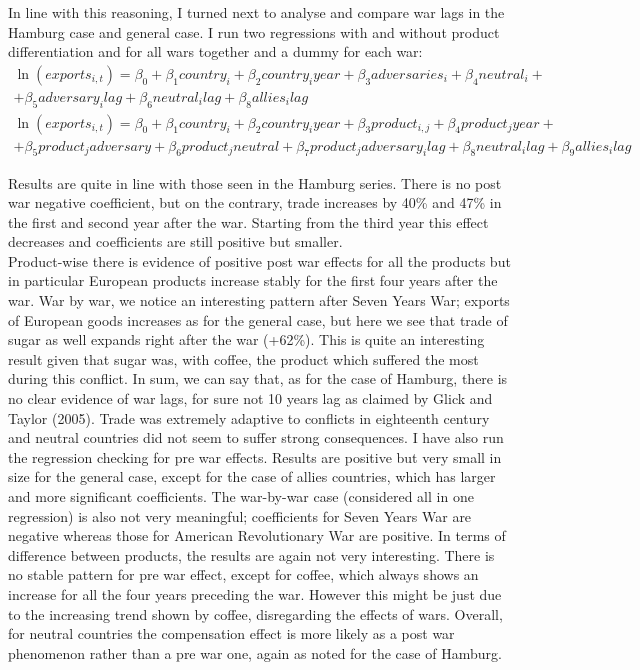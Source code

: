 \documentclass[12pt,a4paper,titlepage]{article}
\begin{document}
In line with this reasoning, I turned next to analyse and compare war lags in the Hamburg case and general case. I run two regressions with and without product differentiation and for all wars together and a dummy for each war: 
\begin{multline}
\ln(exports_{i,t})=\beta_0+\beta_1country_i+\beta_2country_iyear+\beta_3adversaries_i+\beta_4neutral_i+\\+\beta_5adversary_ilag+\beta_6neutral_ilag+\beta_8allies_ilag
\end{multline}
\begin{multline}
\ln(exports_{i,t})=\beta_0+\beta_1country_i+\beta_2country_iyear+\beta_3product_{i,j}+\beta_4product_jyear+\\+\beta_5product_jadversary+ \beta_6product_jneutral+\beta_7product_jadversary_ilag+\beta_8neutral_ilag+\beta_9allies_ilag
\end{multline}

Results are quite in line with those seen in the Hamburg series. There is no post war negative coefficient, but on the contrary, trade increases by 40\% and 47\% in the first and second year after the war. Starting from the third year this effect decreases and coefficients are still positive but smaller. \\
Product-wise there is evidence of positive post war effects for all the products but in particular European products increase stably for the first four years after the war. War by war, we notice an interesting pattern after Seven Years War; exports of European goods increases as for the general case, but here we see that trade of sugar as well expands right after the war (+62\%). This is quite an interesting result given that sugar was, with coffee, the product which suffered the most during this conflict. 
In sum, we can say that, as for the case of Hamburg, there is no clear evidence of war lags, for sure not 10 years lag as claimed by Glick and Taylor (2005). Trade was extremely adaptive to conflicts in eighteenth century and neutral countries did not seem to suffer strong consequences.
I have also run the regression checking for pre war effects. Results are positive but very small in size for the general case, except for the case of allies countries, which has larger and more significant coefficients. The war-by-war case (considered all in one regression) is also not very meaningful; coefficients for Seven Years War are negative whereas those for American Revolutionary War are positive. In terms of difference between products, the results are again not very interesting. There is no stable pattern for pre war effect, except for coffee, which always shows an increase for all the four years preceding the war. However this might be just due to the increasing trend shown by coffee, disregarding the effects of wars.
Overall, for neutral countries the compensation effect is more likely as a post war phenomenon rather than a pre war one, again as noted for the case of Hamburg. 
\end{document}
